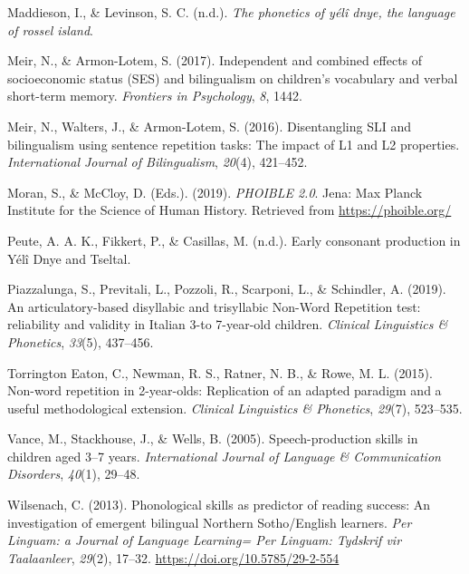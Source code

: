 \documentclass[english,,man,floatsintext]{apa6}
\begin{document}
\leavevmode\hypertarget{ref-maddiesonIPphoneticsYD}{}%
Maddieson, I., \& Levinson, S. C. (n.d.). \emph{The phonetics of yélî dnye, the language of rossel island}.

\leavevmode\hypertarget{ref-meir2017independent}{}%
Meir, N., \& Armon-Lotem, S. (2017). Independent and combined effects of socioeconomic status (SES) and bilingualism on children's vocabulary and verbal short-term memory. \emph{Frontiers in Psychology}, \emph{8}, 1442.

\leavevmode\hypertarget{ref-meir2016disentangling}{}%
Meir, N., Walters, J., \& Armon-Lotem, S. (2016). Disentangling SLI and bilingualism using sentence repetition tasks: The impact of L1 and L2 properties. \emph{International Journal of Bilingualism}, \emph{20}(4), 421--452.

\leavevmode\hypertarget{ref-phoible}{}%
Moran, S., \& McCloy, D. (Eds.). (2019). \emph{PHOIBLE 2.0}. Jena: Max Planck Institute for the Science of Human History. Retrieved from \url{https://phoible.org/}

\leavevmode\hypertarget{ref-peuteIPconsonants}{}%
Peute, A. A. K., Fikkert, P., \& Casillas, M. (n.d.). Early consonant production in Yélî Dnye and Tseltal.

\leavevmode\hypertarget{ref-piazzalunga2019articulatory}{}%
Piazzalunga, S., Previtali, L., Pozzoli, R., Scarponi, L., \& Schindler, A. (2019). An articulatory-based disyllabic and trisyllabic Non-Word Repetition test: reliability and validity in Italian 3-to 7-year-old children. \emph{Clinical Linguistics \& Phonetics}, \emph{33}(5), 437--456.

\leavevmode\hypertarget{ref-torrington2015non}{}%
Torrington Eaton, C., Newman, R. S., Ratner, N. B., \& Rowe, M. L. (2015). Non-word repetition in 2-year-olds: Replication of an adapted paradigm and a useful methodological extension. \emph{Clinical Linguistics \& Phonetics}, \emph{29}(7), 523--535.

\leavevmode\hypertarget{ref-vance2005speech}{}%
Vance, M., Stackhouse, J., \& Wells, B. (2005). Speech-production skills in children aged 3--7 years. \emph{International Journal of Language \& Communication Disorders}, \emph{40}(1), 29--48.

\leavevmode\hypertarget{ref-wilsenach2013phonological}{}%
Wilsenach, C. (2013). Phonological skills as predictor of reading success: An investigation of emergent bilingual Northern Sotho/English learners. \emph{Per Linguam: a Journal of Language Learning= Per Linguam: Tydskrif vir Taalaanleer}, \emph{29}(2), 17--32. \url{https://doi.org/10.5785/29-2-554}
\end{document}
